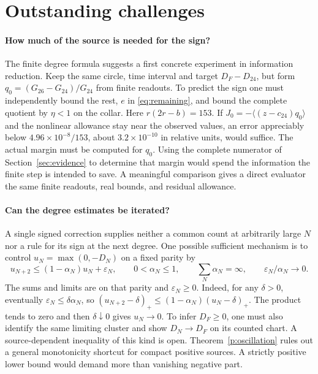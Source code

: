 \section{Outstanding challenges}\label{sec:open}
\paragraph{How much of the source is needed for the sign?}
The finite degree formula suggests a first concrete experiment in information reduction. Keep the same circle, time interval and target \(D_F-D_{24}\), but form \(q_0=(G_{26}-G_{24})/G_{24}\) from finite readouts. To predict the sign one must independently bound the rest, \(e\) in \eqref{eq:remaining}, and bound the complete quotient by \(\eta<1\) on the collar. Here \(r(2r-b)=153\). If \(J_0=-\langle(z-c_{24})q_0\rangle\) and the nonlinear allowance stay near the observed values, an error appreciably below \(4.96\times10^{-8}/153\), about \(3.2\times10^{-10}\) in relative units, would suffice. The actual margin must be computed for \(q_0\). Using the complete numerator of Section~\ref{sec:evidence} to determine that margin would spend the information the finite step is intended to save. A meaningful comparison gives a direct evaluator the same finite readouts, real bounds, and residual allowance.

\paragraph{Can the degree estimates be iterated?}
A single signed correction supplies neither a common count at arbitrarily large \(N\) nor a rule for its sign at the next degree. One possible sufficient mechanism is to control \(u_N=\max(0,-D_N)\) on a fixed parity by
\[
 u_{N+2}\le (1-\alpha_N)u_N+\varepsilon_N,\qquad
 0<\alpha_N\le1,\qquad \sum_N\alpha_N=\infty,\qquad
 \varepsilon_N/\alpha_N\longrightarrow0 .
\]
The sums and limits are on that parity and \(\varepsilon_N\ge0\). Indeed, for any \(\delta>0\), eventually \(\varepsilon_N\le\delta\alpha_N\), so \((u_{N+2}-\delta)_+\le(1-\alpha_N)(u_N-\delta)_+\). The product tends to zero and then \(\delta\downarrow0\) gives \(u_N\to0\). To infer \(D_F\ge0\), one must also identify the same limiting cluster and show \(D_N\to D_F\) on its counted chart. A source-dependent inequality of this kind is open. Theorem~\ref{p:oscillation} rules out a general monotonicity shortcut for compact positive sources. A strictly positive lower bound would demand more than vanishing negative part.


